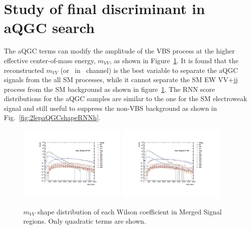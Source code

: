 \section{Study of final discriminant in aQGC search}
\label{subsec:2binapproach}
The aQGC terms can modify the amplitude of the VBS process at the higher effective center-of-mass energy, $m_{VV}$, as shown in Figure~\ref{fig:2lepaQGCshapeMVVh}.
It is found that the reconstructed $m_{VV}$ (or \mt\ in \zlep\ channel) is the best variable to separate the aQGC signals from the all SM processes, while it cannot separate the SM EW VV+jj process from the SM background as shown in figure~\ref{fig:2lepaQGCshapeMVVh}.
The RNN score distributions for the aQGC samples are similar to the one for the SM electroweak signal and still useful to suppress the non-VBS background as shown in Fig.~\ref{fig:2lepaQGCshapeRNNh}.
\begin{figure}[]
    \centering
   \includegraphics[width=0.47\textwidth]{figures/aQGC/MllJ_SR_HP_aQGC.pdf}
   \includegraphics[width=0.47\textwidth]{figures/aQGC/MllJ_SR_LP_aQGC.pdf}
    \caption{$m_{VV}$ shape distribution of each Wilson coefficient in Merged Signal regions. Only quadratic terms are shown.}
    \label{fig:2lepaQGCshapeMVVh}
\end{figure}
